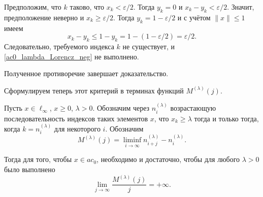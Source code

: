 Предположим, что $k$ таково, что $x_k < \varepsilon/2$.
Тогда $y_k = 0$ и $x_k - y_k < \varepsilon/2$.
Значит, предположение неверно и $x_k \geq \varepsilon/2$.
Тогда $y_k = 1-\varepsilon/2$ и с учётом $\|x\|\leq 1$ имеем
\begin{equation}
	x_k - y_k \leq 1- y_k = 1 - (1-\varepsilon/2) = \varepsilon/2
	.
\end{equation}
Следовательно, требуемого индекса $k$ не существует,
и \eqref{ac0_lambda_Lorencz_neg} не выполнено.

Полученное противоречие завершает доказательство.

Сформулируем теперь этот критерий в терминах функций $M^{(\lambda)}(j)$.

\begin{theorem}
	Пусть $x\in\ell_\infty$, $x \geq 0$, $\lambda>0$.
	Обозначим через $n^{(\lambda)}_i$ возрастающую последовательность
	индексов таких элементов $x$, что $x_k \geq \lambda$ тогда и только тогда,
	когда $k=n^{(\lambda)}_i$ для некоторого $i$.
	Обозначим
	\begin{equation}
		M^{(\lambda)}(j) = \liminf_{i\to\infty} n^{(\lambda)}_{i+j} - n^{(\lambda)}_i
		.
	\end{equation}


	Тогда для того, чтобы $x\in ac_0$, необходимо и достаточно, чтобы
	для любого $\lambda>0$ было выполнено
	\begin{equation}
		\lim_{j \to \infty} \frac{M^{(\lambda)}(j)}{j} = +\infty
		.
	\end{equation}
\end{theorem}
